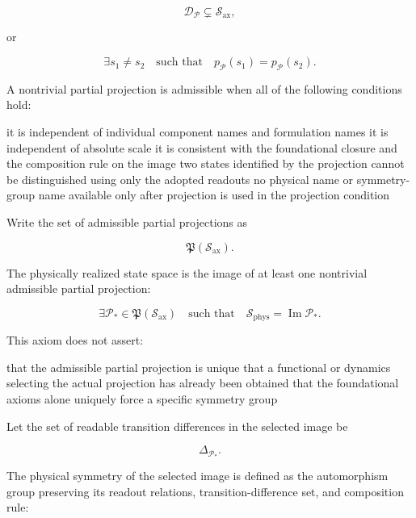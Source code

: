 \documentclass[
  a4paper,
]{article}
\newenvironment{Shaded}{}{}
\newcommand{\NormalTok}[1]{#1}
\begin{document}
\[
\mathscr D_{\mathcal P}
\subsetneq
\mathscr S_{\mathrm{ax}},
\]

or

\[
\exists s_1\ne s_2
\quad\text{such that}\quad
p_{\mathcal P}(s_1)
=
p_{\mathcal P}(s_2).
\]

A nontrivial partial projection is admissible when all of the following
conditions hold:

\begin{Shaded}
\begin{Highlighting}[]
\NormalTok{it is independent of individual component names and formulation names}
\NormalTok{it is independent of absolute scale}
\NormalTok{it is consistent with the foundational closure and the composition rule on the image}
\NormalTok{two states identified by the projection cannot be distinguished using only the adopted readouts}
\NormalTok{no physical name or symmetry{-}group name available only after projection is used in the projection condition}
\end{Highlighting}
\end{Shaded}

Write the set of admissible partial projections as

\[
\mathfrak P(\mathscr S_{\mathrm{ax}}).
\]

The physically realized state space is the image of at least one
nontrivial admissible partial projection:

\[
\boxed{
\exists\mathcal P_*
\in
\mathfrak P(\mathscr S_{\mathrm{ax}})
\quad\text{such that}\quad
\mathscr S_{\mathrm{phys}}
=
\operatorname{Im}\mathcal P_*.
}
\]

This axiom does not assert:

\begin{Shaded}
\begin{Highlighting}[]
\NormalTok{that the admissible partial projection is unique}
\NormalTok{that a functional or dynamics selecting the actual projection has already been obtained}
\NormalTok{that the foundational axioms alone uniquely force a specific symmetry group}
\end{Highlighting}
\end{Shaded}

Let the set of readable transition differences in the selected image be

\[
\Delta_{\mathcal P_*}.
\]

The physical symmetry of the selected image is defined as the
automorphism group preserving its readout relations,
transition-difference set, and composition rule:
\end{document}
